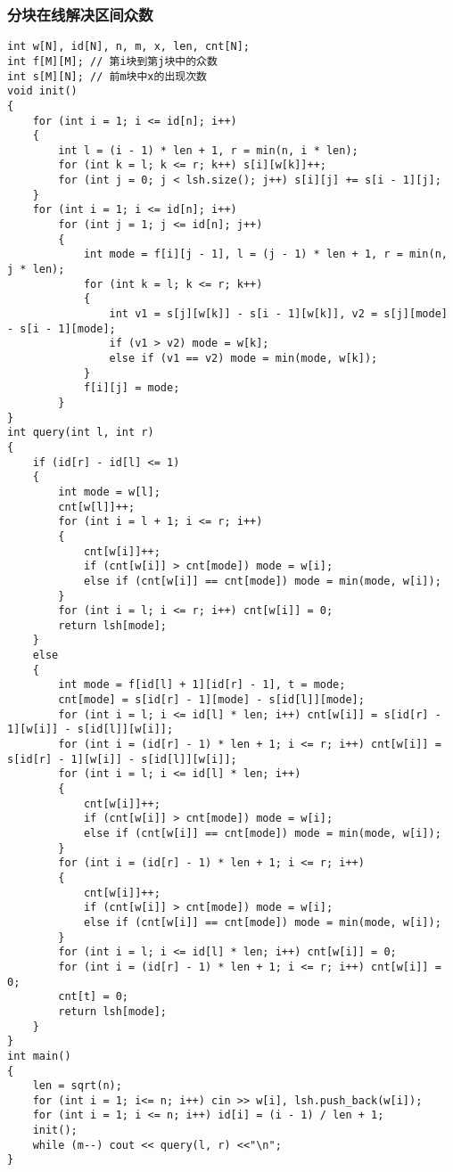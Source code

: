 \documentclass[a4paper, fontset=none]{ctexart}
\begin{document}
\subsubsection{分块在线解决区间众数}
\begin{verbatim}
int w[N], id[N], n, m, x, len, cnt[N];
int f[M][M]; // 第i块到第j块中的众数
int s[M][N]; // 前m块中x的出现次数
void init()
{
    for (int i = 1; i <= id[n]; i++)
    {
        int l = (i - 1) * len + 1, r = min(n, i * len);
        for (int k = l; k <= r; k++) s[i][w[k]]++;
        for (int j = 0; j < lsh.size(); j++) s[i][j] += s[i - 1][j];
    }
    for (int i = 1; i <= id[n]; i++)
        for (int j = 1; j <= id[n]; j++)
        {
            int mode = f[i][j - 1], l = (j - 1) * len + 1, r = min(n, j * len);
            for (int k = l; k <= r; k++)
            {
                int v1 = s[j][w[k]] - s[i - 1][w[k]], v2 = s[j][mode] - s[i - 1][mode];
                if (v1 > v2) mode = w[k];
                else if (v1 == v2) mode = min(mode, w[k]);
            }
            f[i][j] = mode;
        }
}
int query(int l, int r)
{
    if (id[r] - id[l] <= 1)
    {
        int mode = w[l];
        cnt[w[l]]++;
        for (int i = l + 1; i <= r; i++)
        {
            cnt[w[i]]++;
            if (cnt[w[i]] > cnt[mode]) mode = w[i];
            else if (cnt[w[i]] == cnt[mode]) mode = min(mode, w[i]);
        }
        for (int i = l; i <= r; i++) cnt[w[i]] = 0;
        return lsh[mode];
    }
    else
    {
        int mode = f[id[l] + 1][id[r] - 1], t = mode;
        cnt[mode] = s[id[r] - 1][mode] - s[id[l]][mode];
        for (int i = l; i <= id[l] * len; i++) cnt[w[i]] = s[id[r] - 1][w[i]] - s[id[l]][w[i]];
        for (int i = (id[r] - 1) * len + 1; i <= r; i++) cnt[w[i]] = s[id[r] - 1][w[i]] - s[id[l]][w[i]];
        for (int i = l; i <= id[l] * len; i++)
        {
            cnt[w[i]]++;
            if (cnt[w[i]] > cnt[mode]) mode = w[i];
            else if (cnt[w[i]] == cnt[mode]) mode = min(mode, w[i]);
        }
        for (int i = (id[r] - 1) * len + 1; i <= r; i++)
        {
            cnt[w[i]]++;
            if (cnt[w[i]] > cnt[mode]) mode = w[i];
            else if (cnt[w[i]] == cnt[mode]) mode = min(mode, w[i]);
        }
        for (int i = l; i <= id[l] * len; i++) cnt[w[i]] = 0;
        for (int i = (id[r] - 1) * len + 1; i <= r; i++) cnt[w[i]] = 0;
        cnt[t] = 0;
        return lsh[mode];
    }
}
int main()
{
    len = sqrt(n);
    for (int i = 1; i<= n; i++) cin >> w[i], lsh.push_back(w[i]);
    for (int i = 1; i <= n; i++) id[i] = (i - 1) / len + 1;
    init();
    while (m--) cout << query(l, r) <<"\n";
}
\end{verbatim}
\end{document}
